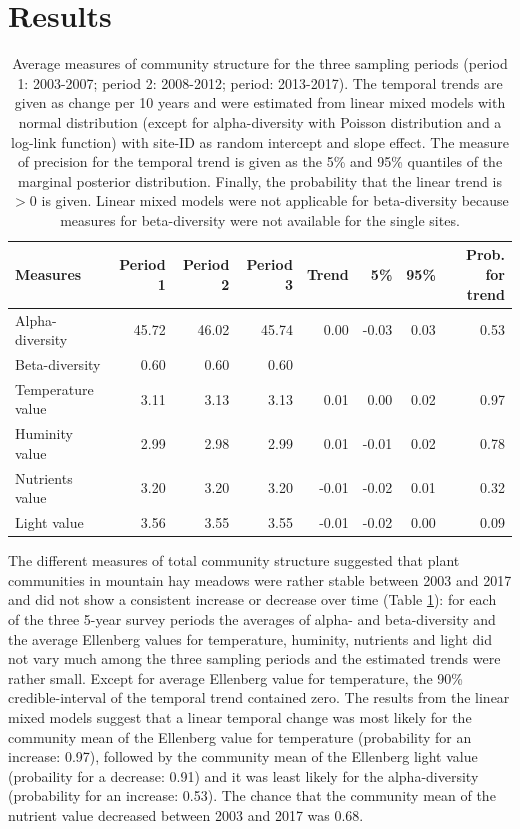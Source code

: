 \documentclass[fleqn,10pt,lineno]{wlpeerj} %
\theoremstyle{definition}
\theoremstyle{definition}
\theoremstyle{definition}
\theoremstyle{remark}
\begin{document}
\section*{Results}\label{results}

\begin{table}

\caption{\label{tab:communitytrendstab}Average measures of community structure for the three sampling periods (period 1: 2003-2007; period 2: 2008-2012; period: 2013-2017). The temporal trends are given as  change per 10 years and were estimated from linear mixed models with normal distribution (except for alpha-diversity with Poisson distribution and a log-link function) with site-ID as random intercept and slope effect. The measure of precision for the temporal trend is given as the 5\% and 95\% quantiles of the marginal posterior distribution. Finally, the probability that the linear trend is $> 0$ is given. Linear mixed models were not applicable for beta-diversity because measures for beta-diversity were not available for the single sites.}
\centering
\begin{tabular}[t]{lrrrrrrr}
\toprule
Measures & Period 1 & Period 2 & Period 3 & Trend & 5\% & 95\% & Prob. for trend\\
\midrule
Alpha-diversity & 45.72 & 46.02 & 45.74 & 0.00 & -0.03 & 0.03 & 0.53\\
Beta-diversity & 0.60 & 0.60 & 0.60 &  &  &  & \\
Temperature value & 3.11 & 3.13 & 3.13 & 0.01 & 0.00 & 0.02 & 0.97\\
Huminity value & 2.99 & 2.98 & 2.99 & 0.01 & -0.01 & 0.02 & 0.78\\
Nutrients value & 3.20 & 3.20 & 3.20 & -0.01 & -0.02 & 0.01 & 0.32\\
Light value & 3.56 & 3.55 & 3.55 & -0.01 & -0.02 & 0.00 & 0.09\\
\bottomrule
\end{tabular}
\end{table}

The different measures of total community structure suggested that plant
communities in mountain hay meadows were rather stable between 2003 and
2017 and did not show a consistent increase or decrease over time (Table
\ref{tab:communitytrendstab}): for each of the three 5-year survey
periods the averages of alpha- and beta-diversity and the average
Ellenberg values for temperature, huminity, nutrients and light did not
vary much among the three sampling periods and the estimated trends were
rather small. Except for average Ellenberg value for temperature, the
90\% credible-interval of the temporal trend contained zero. The results
from the linear mixed models suggest that a linear temporal change was
most likely for the community mean of the Ellenberg value for
temperature (probability for an increase: 0.97), followed by the
community mean of the Ellenberg light value (probaility for a decrease:
0.91) and it was least likely for the alpha-diversity (probability for
an increase: 0.53). The chance that the community mean of the nutrient
value decreased between 2003 and 2017 was 0.68.
\end{document}
